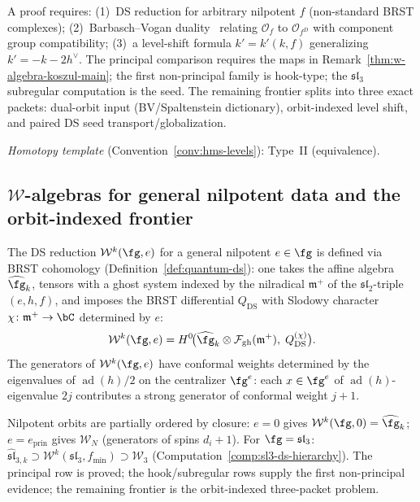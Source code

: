 \begin{remark}[Scope]
A proof requires: (1)~DS reduction for arbitrary nilpotent $f$ (non-standard BRST complexes); (2)~Barbasch--Vogan duality~\cite{BV85} relating $\mathcal{O}_f$ to $\mathcal{O}_{f^D}$ with component group compatibility; (3)~a level-shift formula $k' = k'(k,f)$ generalizing $k' = -k - 2h^\vee$.  The principal comparison requires the maps in Remark~\ref{thm:w-algebra-koszul-main}; the first non-principal family is hook-type; the $\mathfrak{sl}_3$ subregular computation is the seed.  The remaining frontier splits into three exact packets: dual-orbit input (BV/Spaltenstein dictionary), orbit-indexed level shift, and paired DS seed transport/globalization.

\emph{Homotopy template} (Convention~\ref{conv:hms-levels}): Type~II (equivalence).
\end{remark}

\subsection{$\mathcal{W}$-algebras for general nilpotent data and the orbit-indexed frontier}
\label{sec:general-nilpotent-duality}

The DS reduction $\mathcal{W}^k(\fg, e)$ for a general nilpotent
$e \in \fg$ is defined via BRST cohomology
(Definition~\ref{def:quantum-ds}): one takes the affine algebra
$\widehat{\fg}_k$, tensors with a ghost system indexed by the nilradical
$\mathfrak{m}^+$ of the $\mathfrak{sl}_2$-triple $(e, h, f)$, and
imposes the BRST differential $Q_{\mathrm{DS}}$ with Slodowy character
$\chi \colon \mathfrak{m}^+ \to \bC$ determined by $e$:
\begin{equation}\label{eq:general-ds}
\mathcal{W}^k(\fg, e) = H^0\!\bigl(
\widehat{\fg}_k \otimes \mathcal{F}_{\mathrm{gh}}(\mathfrak{m}^+),\;
Q_{\mathrm{DS}}^{(\chi)}\bigr).
\end{equation}
The generators of $\mathcal{W}^k(\fg, e)$ have conformal weights
determined by the eigenvalues of $\operatorname{ad}(h)/2$ on the
centralizer $\fg^e$: each $x \in \fg^e$ of $\operatorname{ad}(h)$-eigenvalue
$2j$ contributes a strong generator of conformal weight $j + 1$.

\begin{remark}
\label{rem:ds-hierarchy-summary}
Nilpotent orbits are partially ordered by closure: $e = 0$ gives $\mathcal{W}^k(\fg, 0) = \widehat{\fg}_k$; $e = e_{\mathrm{prin}}$ gives $\mathcal{W}_N$ (generators of spins $d_i + 1$).  For $\fg = \mathfrak{sl}_3$: $\widehat{\mathfrak{sl}}_{3,k} \supset \mathcal{W}^k(\mathfrak{sl}_3, f_{\min}) \supset \mathcal{W}_3$ (Computation~\ref{comp:sl3-ds-hierarchy}).  The principal row is proved; the hook/subregular rows supply the first non-principal evidence; the remaining frontier is the orbit-indexed three-packet problem.
\end{remark}

